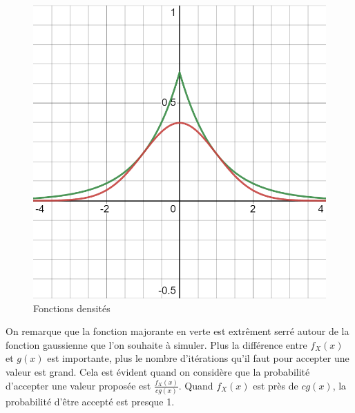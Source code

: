 \documentclass[10pt]{article} %
\begin{document}
\begin{figure}[h!]
\centering
\includegraphics[scale=0.3]{media/desmos-graph.png}
\caption{Fonctions densités}
\end{figure}

On remarque que la fonction majorante en verte est extrêment serré autour de la fonction gaussienne que l'on souhaite à simuler. Plus la différence entre $f_X(x)$ et $g(x)$ est importante, plus le nombre
d'itérations qu'il faut pour accepter une valeur est grand. Cela est évident quand on considère que la probabilité d'accepter une valeur proposée est $\frac{f_X(x)}{cg(x)}$. Quand $f_X(x)$ est près de $cg(x)$,
la probabilité d'être accepté est presque 1.
\end{document}
